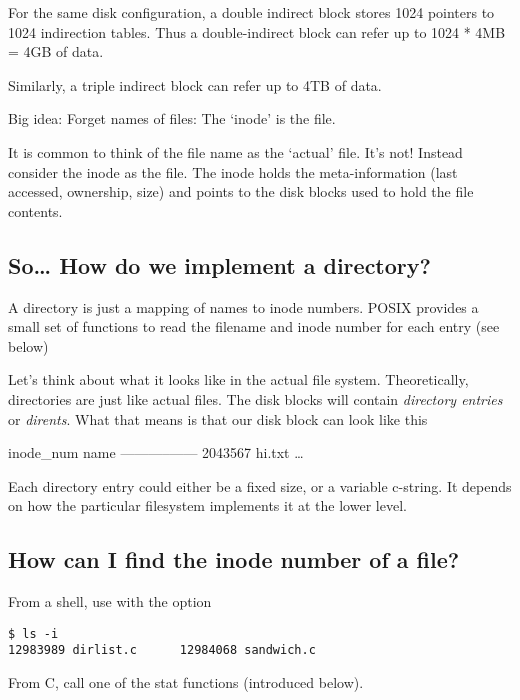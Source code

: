 For the same disk configuration, a double indirect block stores 1024 pointers to 1024 indirection tables. Thus a double-indirect block can refer up to 1024 * 4MB = 4GB of data.

Similarly, a triple indirect block can refer up to 4TB of data.

Big idea: Forget names of files: The `inode' is the file.

It is common to think of the file name as the `actual' file. It's not! Instead consider the inode as the file. The inode holds the meta-information (last accessed, ownership, size) and points to the disk blocks used to hold the file contents.

\subsection{So\ldots{} How do we implement a directory?}\label{so-how-do-we-implement-a-directory}

A directory is just a mapping of names to inode numbers. POSIX provides a small set of functions to read the filename and inode number for each entry (see below)

Let's think about what it looks like in the actual file system. Theoretically, directories are just like actual files. The disk blocks will contain \emph{directory entries} or \emph{dirents}. What that means is that our disk block can look like this

\textbar{} inode\_num \textbar{} name \textbar{} \textbar{}-----------\textbar{}------\textbar{} \textbar{} 2043567 \textbar{} hi.txt \textbar{} \ldots{}

Each directory entry could either be a fixed size, or a variable c-string. It depends on how the particular filesystem implements it at the lower level.

\subsection{How can I find the inode number of a file?}\label{how-can-i-find-the-inode-number-of-a-file}

From a shell, use  with the  option

\begin{lstlisting}
$ ls -i
12983989 dirlist.c      12984068 sandwich.c
\end{lstlisting}

From C, call one of the stat functions (introduced below).

